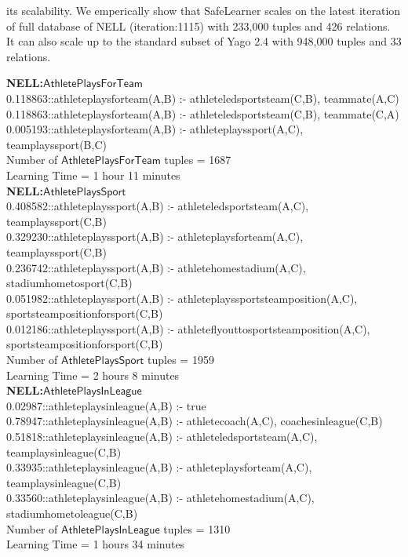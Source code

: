 \documentclass[akbc,twoside,11pt]{article}
\newcommand{\algorithmname}{SafeLearner\xspace}
\begin{document}
 its scalability. We emperically show that \algorithmname scales on the latest iteration of full database of NELL (iteration:1115) with 233,000 tuples and 426 relations.  It can also scale up to the standard subset of Yago 2.4 with 948,000 tuples and 33 relations. \\

\begin{footnotesize}
\noindent \textbf{NELL:$\mathsf{AthletePlaysForTeam}$} \\
0.118863::athleteplaysforteam(A,B) :- athleteledsportsteam(C,B), teammate(A,C) \\
0.118863::athleteplaysforteam(A,B) :- athleteledsportsteam(C,B), teammate(C,A) \\
0.005193::athleteplaysforteam(A,B) :- athleteplayssport(A,C), teamplayssport(B,C) \\
Number of $\mathsf{AthletePlaysForTeam}$ tuples = 1687 \\
Learning Time = 1 hour 11 minutes \\ %

\noindent \textbf{NELL:$\mathsf{AthletePlaysSport}$} \\
0.408582::athleteplayssport(A,B) :- athleteledsportsteam(A,C), teamplayssport(C,B) \\
0.329230::athleteplayssport(A,B) :- athleteplaysforteam(A,C), teamplayssport(C,B) \\
0.236742::athleteplayssport(A,B) :- athletehomestadium(A,C), stadiumhometosport(C,B) \\
0.051982::athleteplayssport(A,B) :- athleteplayssportsteamposition(A,C), sportsteampositionforsport(C,B) \\
0.012186::athleteplayssport(A,B) :- athleteflyouttosportsteamposition(A,C), sportsteampositionforsport(C,B) \\
Number of $\mathsf{AthletePlaysSport}$ tuples = 1959 \\
Learning Time = 2 hours 8 minutes \\ %

\noindent \textbf{NELL:$\mathsf{AthletePlaysInLeague}$} \\
0.02987::athleteplaysinleague(A,B) :- true \\
0.78947::athleteplaysinleague(A,B) :- athletecoach(A,C), coachesinleague(C,B) \\
0.51818::athleteplaysinleague(A,B) :- athleteledsportsteam(A,C), teamplaysinleague(C,B) \\
0.33935::athleteplaysinleague(A,B) :- athleteplaysforteam(A,C), teamplaysinleague(C,B) \\
0.33560::athleteplaysinleague(A,B) :- athletehomestadium(A,C), stadiumhometoleague(C,B) \\
Number of $\mathsf{AthletePlaysInLeague}$ tuples = 1310 \\
Learning Time = 1 hours 34 minutes \\ %


\end{footnotesize}
\end{document}
